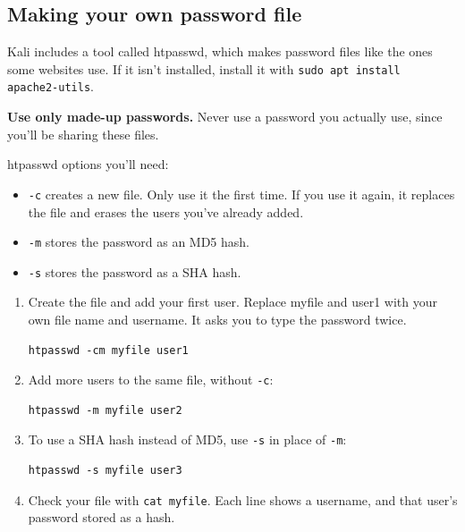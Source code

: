 \documentclass[12pt]{article}
\begin{document}
\subsection*{Making your own password file}
Kali includes a tool called htpasswd, which makes password files like the ones some websites use. If it isn't installed, install it with \texttt{sudo apt install apache2-utils}.

\textbf{Use only made-up passwords.} Never use a password you actually use, since you'll be sharing these files.

htpasswd options you'll need:
\begin{itemize}
    \item \texttt{-c} creates a new file. Only use it the first time. If you use it again, it replaces the file and erases the users you've already added.
    \item \texttt{-m} stores the password as an MD5 hash.
    \item \texttt{-s} stores the password as a SHA hash.
\end{itemize}

\begin{enumerate}
    \item Create the file and add your first user. Replace myfile and user1 with your own file name and username. It asks you to type the password twice.
\begin{Verbatim}
htpasswd -cm myfile user1
\end{Verbatim}
    \item Add more users to the same file, without \texttt{-c}:
\begin{Verbatim}
htpasswd -m myfile user2
\end{Verbatim}
    \item To use a SHA hash instead of MD5, use \texttt{-s} in place of \texttt{-m}:
\begin{Verbatim}
htpasswd -s myfile user3
\end{Verbatim}
    \item Check your file with \texttt{cat myfile}. Each line shows a username, and that user's password stored as a hash.
\end{enumerate}
\end{document}
